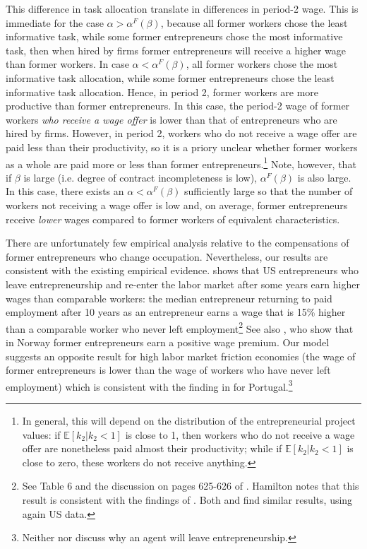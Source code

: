 \documentclass[12pt,american]{paper}
\theoremstyle{remark}
\newcommand{\E}[1]{\mathbb E[#1]}
\begin{document}
This difference in task allocation translate in differences in period-2 wage. This is immediate for the case $\alpha>\alpha^F(\beta)$, because all former workers chose the least informative task, while some former entrepreneurs chose the most informative task, then when hired by firms former entrepreneurs will receive a higher wage than former workers. In case $\alpha<\alpha^F(\beta)$, all former workers chose the most informative task allocation, while some former entrepreneurs chose the least informative task allocation. Hence, in period 2, former workers are more productive than former entrepreneurs. In this case, the period-2 wage of former workers\textit{ who receive a wage offer }is lower than that of entrepreneurs who are hired by firms. However, in period 2, workers who do not receive a wage offer are paid less than their productivity, so it is a priory unclear   whether former workers as a whole are paid more or less than former entrepreneurs.\footnote{In general, this will depend on the distribution of the entrepreneurial project values: if $\E{k_2|k_2<1}$ is close to 1, then workers who do not receive a wage offer are nonetheless paid almost their productivity; while if $\E{k_2|k_2<1}$ is close to zero, these workers do not receive anything.  }
Note, however, that  if $\beta$ is large (i.e. degree of contract incompleteness is low), $\alpha^F(\beta)$ is also large. In this case, there exists  an $\alpha<\alpha^F(\beta)$ sufficiently large so that the number of workers not receiving a wage offer is low and, on average, former entrepreneurs  receive \textit{lower} wages compared to former workers of equivalent characteristics. 

There are unfortunately few empirical analysis relative to the compensations of former entrepreneurs who change occupation. Nevertheless, our results are consistent with the existing empirical evidence. \cite{hamilton2000does} shows that US entrepreneurs who leave entrepreneurship and re-enter the labor market after some years earn higher wages than comparable workers: the median entrepreneur returning to paid employment after 10 years as an entrepreneur earns a wage that is 15\% higher than a comparable worker who never left employment\footnote{See Table 6 and the discussion on pages 625-626 of \cite{hamilton2000does}. Hamilton notes that this result is consistent with the findings of \cite{evans1990}.  Both  \cite{daly2015long} and \cite{Hincapie2020} find similar results, using again US data.} See also \cite{luzzi2016individual}, who show that in Norway former entrepreneurs earn a positive wage premium.  Our model suggests an opposite result for high labor market friction economies (the wage of former entrepreneurs is lower than the wage of workers who have never left employment) which is consistent with the finding in \citet*{baptista2012former} for Portugal.\footnote{Neither \citet{hamilton2000does} nor \citet*{baptista2012former} discuss why an agent will leave entrepreneurship.}
\end{document}
